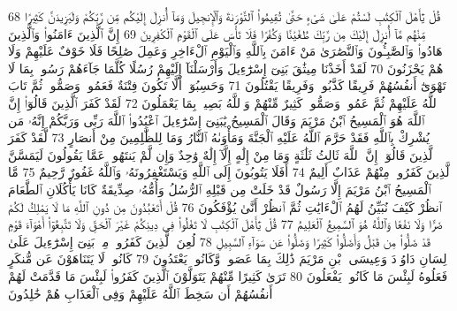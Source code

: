 {\tiny\colorbox{cl_aya}{68}} قُلْ يَٰٓأَهْلَ ٱلْكِتَٰبِ لَسْتُمْ عَلَىٰ شَىْءٍ حَتَّىٰ تُقِيمُوا۟ ٱلتَّوْرَىٰةَ وَٱلْإِنجِيلَ وَمَآ أُنزِلَ إِلَيْكُم مِّن رَّبِّكُمْ وَلَيَزِيدَنَّ كَثِيرًا مِّنْهُم مَّآ أُنزِلَ إِلَيْكَ مِن رَّبِّكَ طُغْيَٰنًا وَكُفْرًا فَلَا تَأْسَ عَلَى ٱلْقَوْمِ ٱلْكَٰفِرِينَ
{\tiny\colorbox{cl_aya}{69}} إِنَّ ٱلَّذِينَ ءَامَنُوا۟ وَٱلَّذِينَ هَادُوا۟ وَٱلصَّٰبِـُٔونَ وَٱلنَّصَٰرَىٰ مَنْ ءَامَنَ بِٱللَّهِ وَٱلْيَوْمِ ٱلْءَاخِرِ وَعَمِلَ صَٰلِحًا فَلَا خَوْفٌ عَلَيْهِمْ وَلَا هُمْ يَحْزَنُونَ
{\tiny\colorbox{cl_aya}{70}} لَقَدْ أَخَذْنَا مِيثَٰقَ بَنِىٓ إِسْرَٰٓءِيلَ وَأَرْسَلْنَآ إِلَيْهِمْ رُسُلًا كُلَّمَا جَآءَهُمْ رَسُولٌۢ بِمَا لَا تَهْوَىٰٓ أَنفُسُهُمْ فَرِيقًا كَذَّبُوا۟ وَفَرِيقًا يَقْتُلُونَ
{\tiny\colorbox{cl_aya}{71}} وَحَسِبُوٓا۟ أَلَّا تَكُونَ فِتْنَةٌ فَعَمُوا۟ وَصَمُّوا۟ ثُمَّ تَابَ ٱللَّهُ عَلَيْهِمْ ثُمَّ عَمُوا۟ وَصَمُّوا۟ كَثِيرٌ مِّنْهُمْ وَٱللَّهُ بَصِيرٌۢ بِمَا يَعْمَلُونَ
{\tiny\colorbox{cl_aya}{72}} لَقَدْ كَفَرَ ٱلَّذِينَ قَالُوٓا۟ إِنَّ ٱللَّهَ هُوَ ٱلْمَسِيحُ ٱبْنُ مَرْيَمَ وَقَالَ ٱلْمَسِيحُ يَٰبَنِىٓ إِسْرَٰٓءِيلَ ٱعْبُدُوا۟ ٱللَّهَ رَبِّى وَرَبَّكُمْ إِنَّهُۥ مَن يُشْرِكْ بِٱللَّهِ فَقَدْ حَرَّمَ ٱللَّهُ عَلَيْهِ ٱلْجَنَّةَ وَمَأْوَىٰهُ ٱلنَّارُ وَمَا لِلظَّٰلِمِينَ مِنْ أَنصَارٍ
{\tiny\colorbox{cl_aya}{73}} لَّقَدْ كَفَرَ ٱلَّذِينَ قَالُوٓا۟ إِنَّ ٱللَّهَ ثَالِثُ ثَلَٰثَةٍ وَمَا مِنْ إِلَٰهٍ إِلَّآ إِلَٰهٌ وَٰحِدٌ وَإِن لَّمْ يَنتَهُوا۟ عَمَّا يَقُولُونَ لَيَمَسَّنَّ ٱلَّذِينَ كَفَرُوا۟ مِنْهُمْ عَذَابٌ أَلِيمٌ
{\tiny\colorbox{cl_aya}{74}} أَفَلَا يَتُوبُونَ إِلَى ٱللَّهِ وَيَسْتَغْفِرُونَهُۥ وَٱللَّهُ غَفُورٌ رَّحِيمٌ
{\tiny\colorbox{cl_aya}{75}} مَّا ٱلْمَسِيحُ ٱبْنُ مَرْيَمَ إِلَّا رَسُولٌ قَدْ خَلَتْ مِن قَبْلِهِ ٱلرُّسُلُ وَأُمُّهُۥ صِدِّيقَةٌ كَانَا يَأْكُلَانِ ٱلطَّعَامَ ٱنظُرْ كَيْفَ نُبَيِّنُ لَهُمُ ٱلْءَايَٰتِ ثُمَّ ٱنظُرْ أَنَّىٰ يُؤْفَكُونَ
{\tiny\colorbox{cl_aya}{76}} قُلْ أَتَعْبُدُونَ مِن دُونِ ٱللَّهِ مَا لَا يَمْلِكُ لَكُمْ ضَرًّا وَلَا نَفْعًا وَٱللَّهُ هُوَ ٱلسَّمِيعُ ٱلْعَلِيمُ
{\tiny\colorbox{cl_aya}{77}} قُلْ يَٰٓأَهْلَ ٱلْكِتَٰبِ لَا تَغْلُوا۟ فِى دِينِكُمْ غَيْرَ ٱلْحَقِّ وَلَا تَتَّبِعُوٓا۟ أَهْوَآءَ قَوْمٍ قَدْ ضَلُّوا۟ مِن قَبْلُ وَأَضَلُّوا۟ كَثِيرًا وَضَلُّوا۟ عَن سَوَآءِ ٱلسَّبِيلِ
{\tiny\colorbox{cl_aya}{78}} لُعِنَ ٱلَّذِينَ كَفَرُوا۟ مِنۢ بَنِىٓ إِسْرَٰٓءِيلَ عَلَىٰ لِسَانِ دَاوُۥدَ وَعِيسَى ٱبْنِ مَرْيَمَ ذَٰلِكَ بِمَا عَصَوا۟ وَّكَانُوا۟ يَعْتَدُونَ
{\tiny\colorbox{cl_aya}{79}} كَانُوا۟ لَا يَتَنَاهَوْنَ عَن مُّنكَرٍ فَعَلُوهُ لَبِئْسَ مَا كَانُوا۟ يَفْعَلُونَ
{\tiny\colorbox{cl_aya}{80}} تَرَىٰ كَثِيرًا مِّنْهُمْ يَتَوَلَّوْنَ ٱلَّذِينَ كَفَرُوا۟ لَبِئْسَ مَا قَدَّمَتْ لَهُمْ أَنفُسُهُمْ أَن سَخِطَ ٱللَّهُ عَلَيْهِمْ وَفِى ٱلْعَذَابِ هُمْ خَٰلِدُونَ
